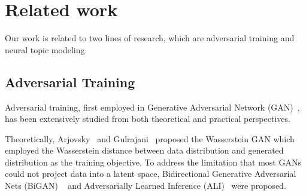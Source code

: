 \documentclass[11pt,a4paper]{article}
\begin{document}
\section{Related work}
Our work is related to two lines of research, which are adversarial training and neural topic modeling.

\begin{comment}
\subsection{Word Representation Learning}
Distributed semantic models have recently been applied successfully in many NLP tasks~\cite{liu2018content,lei2018saan}. A notable example is \emph{word2vec} which relies on the skip-gram with negative sampling training method~\cite{mikolov2013efficient,mikolov2013distributed}. However, \emph{word2vec} only employs local context information. To address this limitation, Pennington~\shortcite{pennington2014glove} proposed a global log-bilinear regression model, called \emph{GloVe}, which combines advantages of the global matrix factorization and local context window methods. To deal with out-of-vocabulary words, \emph{FastText}~\cite{joulin2017bag} was proposed which generates word embeddings as the sum of their character-level $n$-grams representations. More recently, \emph{Probabilistic FastText}~\cite{athiwaratkun2018probabilistic} was proposed which is able to capture multiple word senses, sub-word structure, and uncertainty information jointly.
\end{comment}

\subsection{Adversarial Training}

Adversarial training, first employed in Generative Adversarial Network (GAN)~\cite{goodfellow2014generative}, has been extensively studied from both theoretical and practical perspectives.

Theoretically, Arjovsky~ and Gulrajani~ proposed the Wasserstein GAN which employed the Wasserstein distance between data distribution and generated distribution as the training objective. To address the limitation that most GANs~\cite{goodfellow2014generative,radford2015unsupervised} could not project data into a latent space, Bidirectional Generative Adversarial Nets (BiGAN) ~\cite{donahue2016adversarial} and Adversarially Learned Inference (ALI)~\cite{dumoulin2016adversarially} were proposed.
\end{document}
